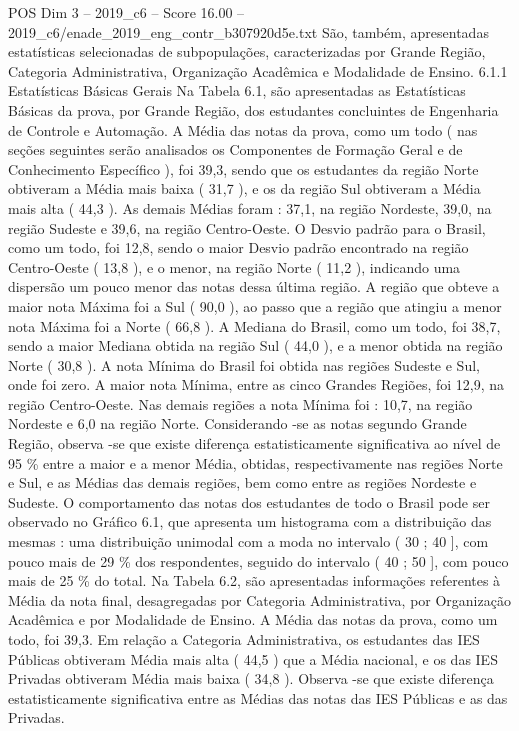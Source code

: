 \begin{textsample}{POS Dim 3 – 2019\_c6 – Score 16.00 – 2019\_c6/enade\_2019\_eng\_contr\_b307920d5e.txt}
São, também, apresentadas estatísticas selecionadas de subpopulações, caracterizadas por Grande Região, Categoria Administrativa, Organização Acadêmica e Modalidade de Ensino. 6.1.1 Estatísticas Básicas Gerais Na Tabela 6.1, são apresentadas as Estatísticas Básicas da prova, por Grande Região, dos estudantes concluintes de Engenharia de Controle e Automação.
A Média das notas da prova, como um todo ( nas seções seguintes serão analisados os Componentes de Formação Geral e de Conhecimento Específico ), foi 39,3, sendo que os estudantes da região Norte obtiveram a Média mais baixa ( 31,7 ), e os da região Sul obtiveram a Média mais alta ( 44,3 ).
As demais Médias foram : 37,1, na região Nordeste, 39,0, na região Sudeste e 39,6, na região Centro-Oeste.
O Desvio padrão para o Brasil, como um todo, foi 12,8, sendo o maior Desvio padrão encontrado na região Centro-Oeste ( 13,8 ), e o menor, na região Norte ( 11,2 ), indicando uma dispersão um pouco menor das notas dessa última região.
A região que obteve a maior nota Máxima foi a Sul ( 90,0 ), ao passo que a região que atingiu a menor nota Máxima foi a Norte ( 66,8 ).
A Mediana do Brasil, como um todo, foi 38,7, sendo a maior Mediana obtida na região Sul ( 44,0 ), e a menor obtida na região Norte ( 30,8 ).
A nota Mínima do Brasil foi obtida nas regiões Sudeste e Sul, onde foi zero.
A maior nota Mínima, entre as cinco Grandes Regiões, foi 12,9, na região Centro-Oeste.
Nas demais regiões a nota Mínima foi : 10,7, na região Nordeste e 6,0 na região Norte.
Considerando -se as notas segundo Grande Região, observa -se que existe diferença estatisticamente significativa ao nível de 95 \% entre a maior e a menor Média, obtidas, respectivamente nas regiões Norte e Sul, e as Médias das demais regiões, bem como entre as regiões Nordeste e Sudeste.
O comportamento das notas dos estudantes de todo o Brasil pode ser observado no Gráfico 6.1, que apresenta um histograma com a distribuição das mesmas : uma distribuição unimodal com a moda no intervalo ( 30 ; 40 ], com pouco mais de 29 \% dos respondentes, seguido do intervalo ( 40 ; 50 ], com pouco mais de 25 \% do total.
Na Tabela 6.2, são apresentadas informações referentes à Média da nota final, desagregadas por Categoria Administrativa, por Organização Acadêmica e por Modalidade de Ensino.
A Média das notas da prova, como um todo, foi 39,3.
Em relação a Categoria Administrativa, os estudantes das IES Públicas obtiveram Média mais alta ( 44,5 ) que a Média nacional, e os das IES Privadas obtiveram Média mais baixa ( 34,8 ).
Observa -se que existe diferença estatisticamente significativa entre as Médias das notas das IES Públicas e as das Privadas.

\end{textsample}
